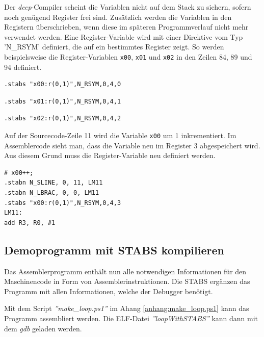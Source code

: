 Der \textit{deep}-Compiler scheint die Variablen nicht auf dem Stack zu sichern, sofern noch genügend Register frei sind.
Zusätzlich werden die Variablen in den Registern überschrieben, wenn diese im späteren Programmverlauf nicht mehr verwendet werden.
Eine Register-Variable wird mit einer Direktive vom Typ 'N\_RSYM' definiert, die auf ein bestimmtes Register zeigt.
So werden beispielsweise die Register-Variablen \texttt{x00}, \texttt{x01} und \texttt{x02} in den Zeilen 84, 89 und 94 definiert.

\begin{lstlisting}
.stabs "x00:r(0,1)",N_RSYM,0,4,0
\end{lstlisting}

\begin{lstlisting}
.stabs "x01:r(0,1)",N_RSYM,0,4,1
\end{lstlisting}

\begin{lstlisting}
.stabs "x02:r(0,1)",N_RSYM,0,4,2
\end{lstlisting}
\lstset{firstnumber=1}


Auf der Sourcecode-Zeile 11 wird die Variable \texttt{x00} um 1 inkrementiert.
Im Assemblercode sieht man, dass die Variable neu im Register 3 abgespeichert wird.
Aus diesem Grund muss die Register-Variable neu definiert werden.

\begin{lstlisting}
# x00++;
.stabn N_SLINE, 0, 11, LM11
.stabn N_LBRAC, 0, 0, LM11
.stabs "x00:r(0,1)",N_RSYM,0,4,3
LM11:
add R3, R0, #1
\end{lstlisting}
\lstset{firstnumber=1}



\subsection{Demoprogramm mit STABS kompilieren}
Das Assemblerprogramm enthält nun alle notwendigen Informationen für den Maschinencode in Form von Assemblerinstruktionen.
Die STABS ergänzen das Programm mit allen Informationen, welche der Debugger benötigt.

Mit dem Script \textit{''make\_loop.ps1''} im Ahang \ref{anhang:make_loop.ps1} kann das Programm assembliert werden.
Die ELF-Datei \textit{''loopWithSTABS''} kann dann mit dem \textit{gdb} geladen werden.



